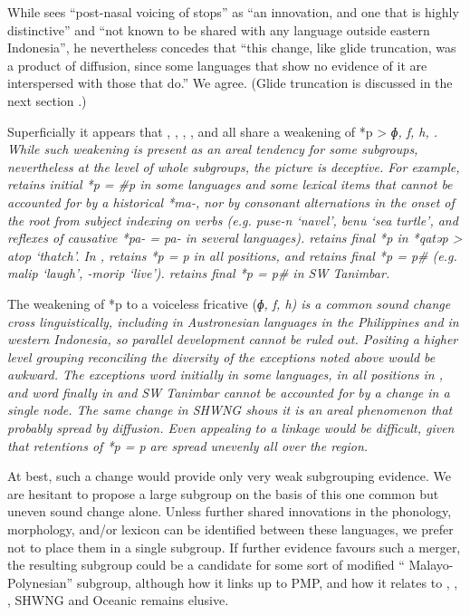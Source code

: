 While \citet[72]{Blust2009} sees “post-nasal voicing of stops”
as “an innovation, and one that is highly distinctive”
and “not known to be shared with any language outside eastern
Indonesia”, he nevertheless concedes that “this change,
like glide truncation, was a product of diffusion,
since some languages that show no evidence of it are interspersed
with those that do.” We agree.
(Glide truncation is discussed in the next section .)

Superficially it appears that ,
, , , and 
all share a weakening of *p > \it{ɸ, f, h}, {\0}.
While such weakening is present as an areal tendency for some
subgroups, nevertheless at the level of whole subgroups,
the picture is deceptive.
For example,  retains initial *p = \it{{\#}p} in
some languages and some lexical items that cannot be accounted for by a historical
*ma-, nor by consonant alternations in the onset of the root from subject
indexing on verbs (e.g.
 \it{puse-n} ‘navel’,  \it{benu} ‘sea turtle’,
and reflexes of causative *pa- = \it{pa-} in several languages).
 retains final *p in *qatəp > \it{atop} ‘thatch’.
In ,  retains *p = \it{p} in all positions,
and  retains final *p = \it{p{\#}} (e.g.
\it{malip} ‘laugh’, \it{-morip} ‘live’).
 retains final *p = \it{p{\#}} in SW Tanimbar.

The weakening of *p to a voiceless fricative (\it{ɸ,
f, h}) is a common sound change cross linguistically,
including in Austronesian languages in the Philippines
and in western Indonesia,
so parallel development cannot be ruled out.
Positing a higher level grouping reconciling the diversity of
the exceptions noted above would be awkward.
The exceptions word initially in some  languages,
in all positions in ,
and word finally in 
and SW Tanimbar cannot be accounted for by a change in a single node.
The same change in SHWNG shows it is an areal phenomenon that
probably spread by diffusion.
Even appealing to a linkage would be difficult,
given that retentions of *p = \it{p} are spread unevenly all over the region.

At best, such a change would provide only very weak subgrouping evidence.
We are hesitant to propose a large subgroup on the basis of this
one common but uneven sound change alone.
Unless further shared innovations in the phonology,
morphology, and/or lexicon can be identified between these languages,
we prefer not to place them in a single subgroup.
If further evidence favours such a merger,
the resulting subgroup could be a candidate for some sort of
modified “ Malayo-Polynesian” subgroup,
although how it links up to PMP,
and how it relates to ,
, , SHWNG and Oceanic remains elusive.

